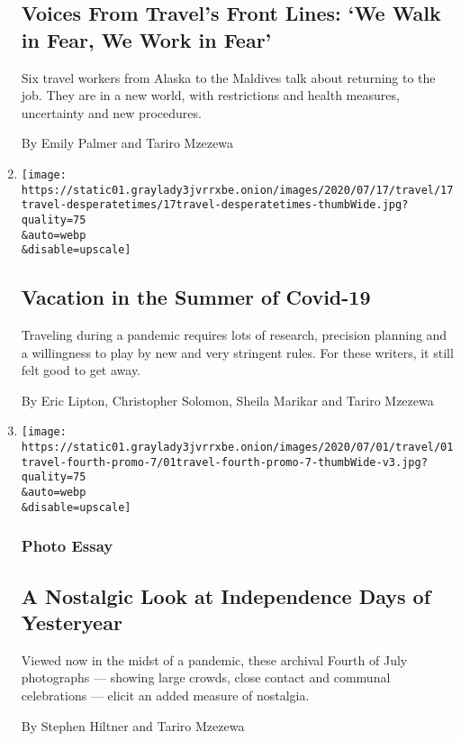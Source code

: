 \begin{enumerate}
  \hypertarget{voices-from-travels-front-lines-we-walk-in-fear-we-work-in-fear}{%
  \subsection{Voices From Travel's Front Lines: `We Walk in Fear, We
  Work in
  Fear'}\label{voices-from-travels-front-lines-we-walk-in-fear-we-work-in-fear}}

  Six travel workers from Alaska to the Maldives talk about returning to
  the job. They are in a new world, with restrictions and health
  measures, uncertainty and new procedures.

  By Emily Palmer and Tariro Mzezewa
\item
  \href{/2020/07/16/travel/virus-vacation.html}{}

  \texttt{[image: https://static01.graylady3jvrrxbe.onion/images/2020/07/17/travel/17travel-desperatetimes/17travel-desperatetimes-thumbWide.jpg?quality=75\\\&auto=webp\\\&disable=upscale]}

  \hypertarget{vacation-in-the-summer-of-covid-19}{%
  \subsection{Vacation in the Summer of
  Covid-19}\label{vacation-in-the-summer-of-covid-19}}

  Traveling during a pandemic requires lots of research, precision
  planning and a willingness to play by new and very stringent rules.
  For these writers, it still felt good to get away.

  By Eric Lipton, Christopher Solomon, Sheila Marikar and Tariro Mzezewa
\item
  \href{/2020/07/01/travel/independence-day-archival-photos.html}{}

  \texttt{[image: https://static01.graylady3jvrrxbe.onion/images/2020/07/01/travel/01travel-fourth-promo-7/01travel-fourth-promo-7-thumbWide-v3.jpg?quality=75\\\&auto=webp\\\&disable=upscale]}

  \hypertarget{photo-essay}{%
  \subsubsection{Photo Essay}\label{photo-essay}}

  \hypertarget{a-nostalgic-look-at-independence-days-of-yesteryear}{%
  \subsection{A Nostalgic Look at Independence Days of
  Yesteryear}\label{a-nostalgic-look-at-independence-days-of-yesteryear}}

  Viewed now in the midst of a pandemic, these archival Fourth of July
  photographs --- showing large crowds, close contact and communal
  celebrations --- elicit an added measure of nostalgia.

  By Stephen Hiltner and Tariro Mzezewa
\end{enumerate}

